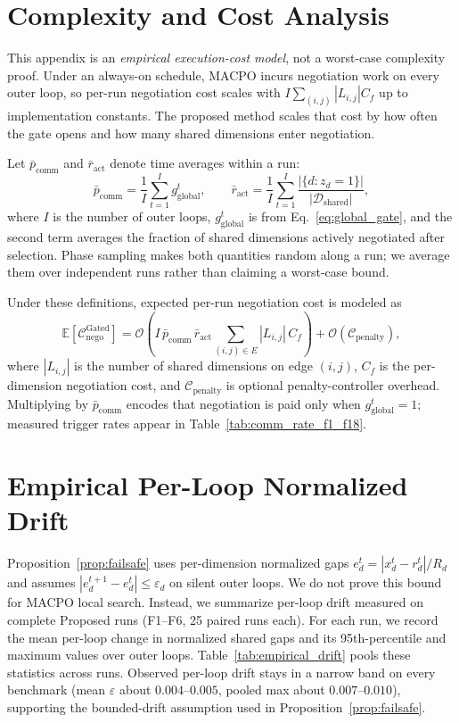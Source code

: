 \documentclass[conference]{IEEEtran}
\begin{document}
\appendices
\section{Complexity and Cost Analysis}\label{sec:complexity}\label{sec:exec_cost}
This appendix is an \emph{empirical execution-cost model}, not a worst-case complexity proof. Under an always-on schedule, MACPO incurs negotiation work on every outer loop, so per-run negotiation cost scales with $I\sum_{(i,j)}|L_{i,j}|C_f$ up to implementation constants. The proposed method scales that cost by how often the gate opens and how many shared dimensions enter negotiation.

Let $\bar p_{\mathrm{comm}}$ and $\bar r_{\mathrm{act}}$ denote time averages within a run:
\begin{equation}
\bar p_{\mathrm{comm}}=\frac{1}{I}\sum_{t=1}^{I} g_{\mathrm{global}}^t,
\qquad
\bar r_{\mathrm{act}}=\frac{1}{I}\sum_{t=1}^{I}\frac{|\{d:z_d=1\}|}{|\mathcal{D}_{\mathrm{shared}}|},
\label{eq:empirical_averages}
\end{equation}
where $I$ is the number of outer loops, $g_{\mathrm{global}}^t$ is from Eq.~\eqref{eq:global_gate}, and the second term averages the fraction of shared dimensions actively negotiated after selection. Phase sampling makes both quantities random along a run; we average them over independent runs rather than claiming a worst-case bound.

Under these definitions, expected per-run negotiation cost is modeled as
\begin{equation}
\mathbb{E}\!\left[\mathcal{C}_{\mathrm{nego}}^{\mathrm{Gated}}\right]
=
\mathcal{O}\!\left(
I\,\bar p_{\mathrm{comm}}\,\bar r_{\mathrm{act}}
\sum_{(i,j)\in E}|L_{i,j}|\,C_f
\right)+\mathcal{O}(\mathcal{C}_{\mathrm{penalty}}),
\label{eq:nego_complexity}
\end{equation}
where $|L_{i,j}|$ is the number of shared dimensions on edge $(i,j)$, $C_f$ is the per-dimension negotiation cost, and $\mathcal{C}_{\mathrm{penalty}}$ is optional penalty-controller overhead. Multiplying by $\bar p_{\mathrm{comm}}$ encodes that negotiation is paid only when $g_{\mathrm{global}}^t{=}1$; measured trigger rates appear in Table~\ref{tab:comm_rate_f1_f18}.

\section{Empirical Per-Loop Normalized Drift}\label{app:empirical_drift}
Proposition~\ref{prop:failsafe} uses per-dimension normalized gaps $e_d^t=|x_d^t-r_d^t|/R_d$ and assumes $|e_d^{t+1}-e_d^t|\le \varepsilon_d$ on silent outer loops. We do not prove this bound for MACPO local search. Instead, we summarize per-loop drift measured on complete Proposed runs (F1--F6, 25 paired runs each). For each run, we record the mean per-loop change in normalized shared gaps and its 95th-percentile and maximum values over outer loops. Table~\ref{tab:empirical_drift} pools these statistics across runs. Observed per-loop drift stays in a narrow band on every benchmark (mean $\varepsilon$ about $0.004$--$0.005$, pooled max about $0.007$--$0.010$), supporting the bounded-drift assumption used in Proposition~\ref{prop:failsafe}.
\end{document}
